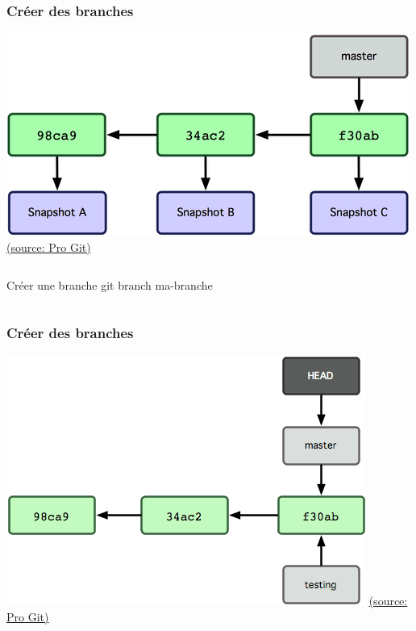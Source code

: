\documentclass[t,11pt]{beamer}
\begin{document}
\begin{frame}
        \frametitle{Cr\'eer des branches}
        \centering
        \hspace{10mm}
        \includegraphics[width=\linewidth,height=0.4\textheight,keepaspectratio]{./img/branching_1}
        \newline
        \href{https://git-scm.com/book/fr/v1/Les-branches-avec-Git-Ce-qu-est-une-branche}{{\tiny (source: Pro Git)}}
        \begin{columns}
                \begin{block}{Cr\'eer une branche}
                        \centering
                        git branch ma-branche
                \end{block}
        \end{columns}
\end{frame}

\begin{frame}
        \frametitle{Cr\'eer des branches}
        \centering
        \includegraphics[width=\linewidth,height=0.8\textheight,keepaspectratio]{./img/branching_2}
        \newline
        \href{https://git-scm.com/book/fr/v1/Les-branches-avec-Git-Ce-qu-est-une-branche}{{\tiny (source: Pro Git)}}
\end{frame}
\end{document}

